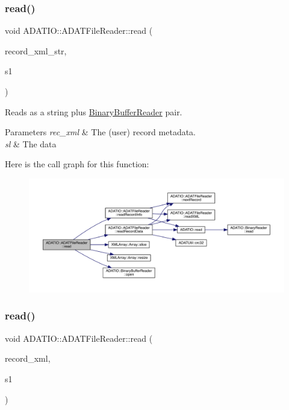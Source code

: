 \subsubsection{\texorpdfstring{read()}{read()}\hspace{0.1cm}{\footnotesize\ttfamily [3/7]}}
{\footnotesize\ttfamily void A\+D\+A\+T\+I\+O\+::\+A\+D\+A\+T\+File\+Reader\+::read (\begin{DoxyParamCaption}\item[{std\+::string \&}]{record\+\_\+xml\+\_\+str,  }\item[{\mbox{\hyperlink{classADATIO_1_1BinaryBufferReader}{Binary\+Buffer\+Reader}} \&}]{s1 }\end{DoxyParamCaption})}



Reads as a string plus \mbox{\hyperlink{classADATIO_1_1BinaryBufferReader}{Binary\+Buffer\+Reader}} pair. 


\begin{DoxyParams}{Parameters}
{\em rec\+\_\+xml} & The (user) record metadata. \\
\hline
{\em sl} & The data \\
\hline
\end{DoxyParams}
Here is the call graph for this function\+:
\nopagebreak
\begin{figure}[H]
\begin{center}
\leavevmode
\includegraphics[width=350pt]{db/de5/group__qio_ga2179348a566e0224ed2122acfabf8bc9_cgraph}
\end{center}
\end{figure}
\mbox{\label{group__qio_gadf1e0b4405e14798a0610efd8774f8d0}} 
\subsubsection{\texorpdfstring{read()}{read()}\hspace{0.1cm}{\footnotesize\ttfamily [4/7]}}
{\footnotesize\ttfamily void A\+D\+A\+T\+I\+O\+::\+A\+D\+A\+T\+File\+Reader\+::read (\begin{DoxyParamCaption}\item[{\mbox{\hyperlink{classADATXML_1_1XMLReader}{X\+M\+L\+Reader}} \&}]{record\+\_\+xml,  }\item[{\mbox{\hyperlink{classADATIO_1_1BinaryBufferReader}{Binary\+Buffer\+Reader}} \&}]{s1 }\end{DoxyParamCaption})}



